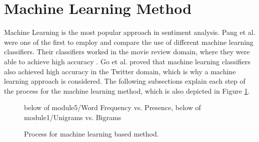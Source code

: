\section{Machine Learning Method}
Machine Learning is the most popular approach in sentiment analysis. Pang et al. were one of the first to employ and compare the use of different machine learning classifiers. Their classifiers worked in the movie review domain, where they were able to achieve high accuracy \cite{pang-etal-2002-thumbs}. Go et al. proved that machine learning classifiers also achieved high accuracy in the Twitter domain, which is why a machine learning approach is considered. The following subsections explain each step of the process for the machine learning method, which is also depicted in Figure \ref{fig:ml_process}.

\begin{figure}
    \centering

    {below of module5/Word Frequency vs. Presence, below of module1/Unigrams vs. Bigrams} 

    \vspace{25mm}

   \caption{Process for machine learning based method.}
    \label{fig:ml_process}
\end{figure}

